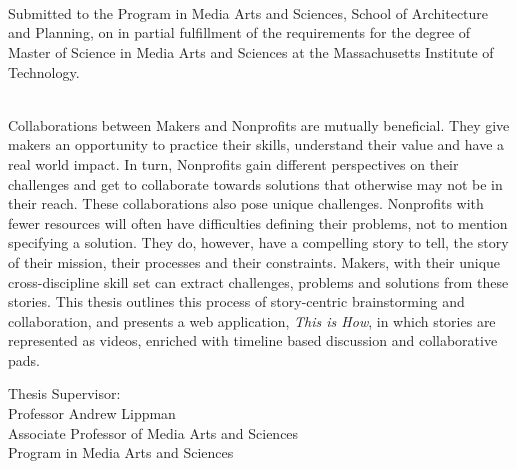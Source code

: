 \begin{titlepage}
      {\setlength{\parindent}{0cm}
        \large  


        \hfill


        \begingroup

            \color{Maroon}\spacedallcaps{\myTitle} \\ 
            \mySubtitle \\ 

            \bigskip
        \endgroup

        \spacedlowsmallcaps{\myName}\\ \medskip

   Submitted to the Program in Media Arts and Sciences, School of Architecture and Planning, on \myTime in partial fulfillment of the requirements for the degree of Master of Science in Media Arts and Sciences at the Massachusetts Institute of Technology. \\ 

\bigskip
{}\\ \medskip

Collaborations between Makers and Nonprofits are mutually beneficial. They give makers an opportunity to practice their skills, understand their value and have a real world impact. In turn, Nonprofits gain different perspectives on their challenges and get to collaborate towards solutions that otherwise may not be in their reach. These collaborations also pose unique challenges. Nonprofits with fewer resources will often have difficulties defining their problems, not to mention specifying a solution. They do, however, have a compelling story to tell, the story of their mission, their processes and their constraints. Makers, with their unique cross-discipline skill set can extract challenges, problems and solutions from these stories. This thesis outlines this process of story-centric brainstorming and collaboration, and presents a web application, \textit{This is How}, in which stories are represented as videos, enriched with timeline based discussion and collaborative pads.  
\vfill


Thesis Supervisor:\\
Professor Andrew Lippman\\
Associate Professor of Media Arts and Sciences\\
Program in Media Arts and Sciences

        }
\end{titlepage}   
